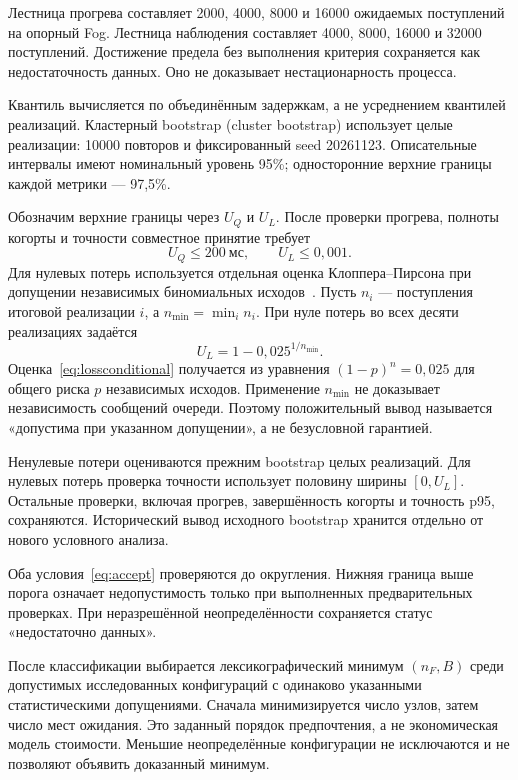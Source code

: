 \documentclass{psta}
\begin{document}
Лестница прогрева составляет 2000, 4000, 8000 и 16000 ожидаемых поступлений на опорный Fog. Лестница наблюдения составляет 4000, 8000, 16000 и 32000 поступлений. Достижение предела без выполнения критерия сохраняется как недостаточность данных. Оно не доказывает нестационарность процесса.

Квантиль вычисляется по объединённым задержкам, а не усреднением квантилей реализаций. Кластерный bootstrap (cluster bootstrap) использует целые реализации: 10000 повторов и фиксированный seed 20261123. Описательные интервалы имеют номинальный уровень 95\%; односторонние верхние границы каждой метрики --- 97,5\%.

Обозначим верхние границы через $U_Q$ и $U_L$. После проверки прогрева, полноты когорты и точности совместное принятие требует
\begin{equation}\label{eq:accept}
 U_Q\leq200\ \text{мс},\qquad U_L\leq0{,}001.
\end{equation}
Для нулевых потерь используется отдельная оценка Клоппера--Пирсона при допущении независимых биномиальных исходов~\cite{clopper}. Пусть $n_i$ --- поступления итоговой реализации $i$, а $n_{\min}=\min_i n_i$. При нуле потерь во всех десяти реализациях задаётся
\begin{equation}\label{eq:lossconditional}
 U_L=1-0{,}025^{1/n_{\min}}.
\end{equation}
Оценка~\eqref{eq:lossconditional} получается из уравнения $(1-p)^n=0{,}025$ для общего риска $p$ независимых исходов. Применение $n_{\min}$ не доказывает независимость сообщений очереди. Поэтому положительный вывод называется «допустима при указанном допущении», а не безусловной гарантией.

Ненулевые потери оцениваются прежним bootstrap целых реализаций. Для нулевых потерь проверка точности использует половину ширины $[0,U_L]$. Остальные проверки, включая прогрев, завершённость когорты и точность p95, сохраняются. Исторический вывод исходного bootstrap хранится отдельно от нового условного анализа.

Оба условия~\eqref{eq:accept} проверяются до округления. Нижняя граница выше порога означает недопустимость только при выполненных предварительных проверках. При неразрешённой неопределённости сохраняется статус «недостаточно данных».

После классификации выбирается лексикографический минимум $(n_F,B)$ среди допустимых исследованных конфигураций с одинаково указанными статистическими допущениями. Сначала минимизируется число узлов, затем число мест ожидания. Это заданный порядок предпочтения, а не экономическая модель стоимости. Меньшие неопределённые конфигурации не исключаются и не позволяют объявить доказанный минимум.
\end{document}
